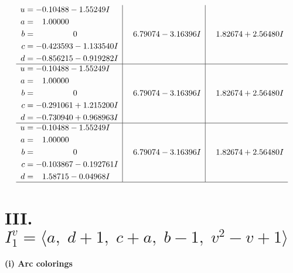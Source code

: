 \documentclass[1p]{elsarticle_modified}
\theoremstyle{definition}
\begin{document}
$$\begin{array}{c|c|c}
\begin{aligned}
u &= -0.10488 - 1.55249 I \\
a &= \phantom{-}1.00000\phantom{ +0.000000I} \\
b &= \phantom{-0.000000 } 0 \\
c &= -0.423593 - 1.133540 I \\
d &= -0.856215 - 0.919282 I\end{aligned}
 & \phantom{-}6.79074 - 3.16396 I & \phantom{-}1.82674 + 2.56480 I \\ \hline\begin{aligned}
u &= -0.10488 - 1.55249 I \\
a &= \phantom{-}1.00000\phantom{ +0.000000I} \\
b &= \phantom{-0.000000 } 0 \\
c &= -0.291061 + 1.215200 I \\
d &= -0.730940 + 0.968963 I\end{aligned}
 & \phantom{-}6.79074 - 3.16396 I & \phantom{-}1.82674 + 2.56480 I \\ \hline\begin{aligned}
u &= -0.10488 - 1.55249 I \\
a &= \phantom{-}1.00000\phantom{ +0.000000I} \\
b &= \phantom{-0.000000 } 0 \\
c &= -0.103867 - 0.192761 I \\
d &= \phantom{-}1.58715 - 0.04968 I\end{aligned}
 & \phantom{-}6.79074 - 3.16396 I & \phantom{-}1.82674 + 2.56480 I\\
 \hline 
 \end{array}$$\newpage\newpage\renewcommand{\arraystretch}{1}
\centering \section*{III. $I^v_{1}= \langle a,\;d+1,\;c+a,\;b-1,\;v^2- v+1 \rangle$}
\flushleft \textbf{(i) Arc colorings}\\
\end{document}

